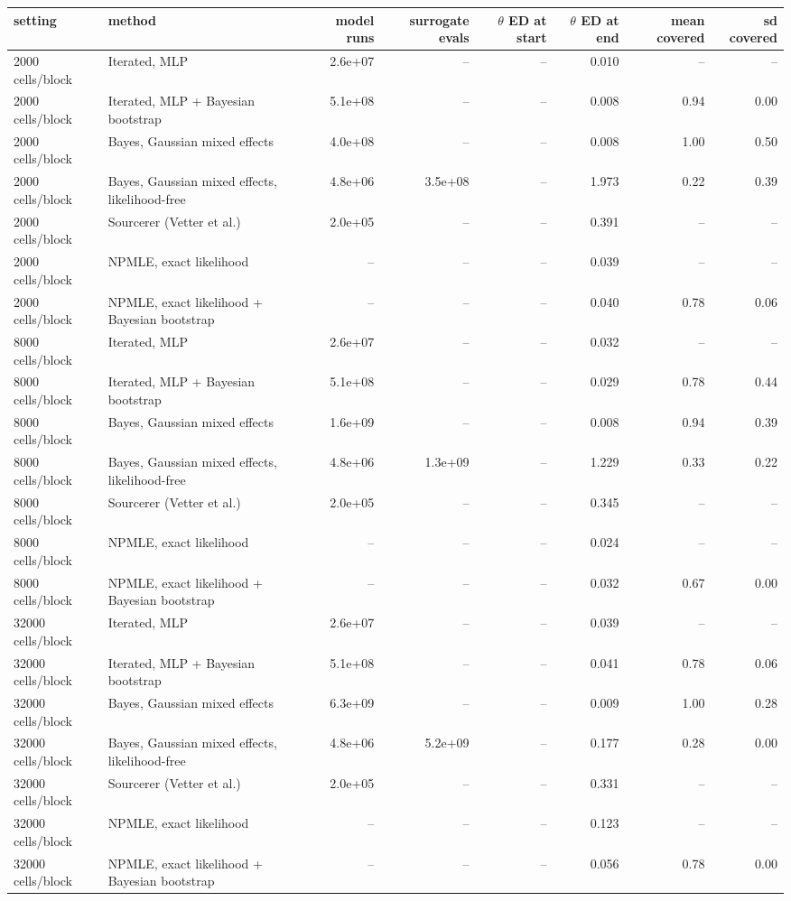 \begin{tabular}{llrrrrrr}
\toprule
setting & method & model runs & surrogate evals & $\theta$ ED at start & $\theta$ ED at end & mean covered & sd covered \\
\midrule
2000 cells/block & Iterated, MLP & 2.6e+07 & -- & -- & 0.010 & -- & -- \\
2000 cells/block & Iterated, MLP + Bayesian bootstrap & 5.1e+08 & -- & -- & 0.008 & 0.94 & 0.00 \\
2000 cells/block & Bayes, Gaussian mixed effects & 4.0e+08 & -- & -- & 0.008 & 1.00 & 0.50 \\
2000 cells/block & Bayes, Gaussian mixed effects, likelihood-free & 4.8e+06 & 3.5e+08 & -- & 1.973 & 0.22 & 0.39 \\
2000 cells/block & Sourcerer (Vetter et al.) & 2.0e+05 & -- & -- & 0.391 & -- & -- \\
2000 cells/block & NPMLE, exact likelihood & -- & -- & -- & 0.039 & -- & -- \\
2000 cells/block & NPMLE, exact likelihood + Bayesian bootstrap & -- & -- & -- & 0.040 & 0.78 & 0.06 \\
8000 cells/block & Iterated, MLP & 2.6e+07 & -- & -- & 0.032 & -- & -- \\
8000 cells/block & Iterated, MLP + Bayesian bootstrap & 5.1e+08 & -- & -- & 0.029 & 0.78 & 0.44 \\
8000 cells/block & Bayes, Gaussian mixed effects & 1.6e+09 & -- & -- & 0.008 & 0.94 & 0.39 \\
8000 cells/block & Bayes, Gaussian mixed effects, likelihood-free & 4.8e+06 & 1.3e+09 & -- & 1.229 & 0.33 & 0.22 \\
8000 cells/block & Sourcerer (Vetter et al.) & 2.0e+05 & -- & -- & 0.345 & -- & -- \\
8000 cells/block & NPMLE, exact likelihood & -- & -- & -- & 0.024 & -- & -- \\
8000 cells/block & NPMLE, exact likelihood + Bayesian bootstrap & -- & -- & -- & 0.032 & 0.67 & 0.00 \\
32000 cells/block & Iterated, MLP & 2.6e+07 & -- & -- & 0.039 & -- & -- \\
32000 cells/block & Iterated, MLP + Bayesian bootstrap & 5.1e+08 & -- & -- & 0.041 & 0.78 & 0.06 \\
32000 cells/block & Bayes, Gaussian mixed effects & 6.3e+09 & -- & -- & 0.009 & 1.00 & 0.28 \\
32000 cells/block & Bayes, Gaussian mixed effects, likelihood-free & 4.8e+06 & 5.2e+09 & -- & 0.177 & 0.28 & 0.00 \\
32000 cells/block & Sourcerer (Vetter et al.) & 2.0e+05 & -- & -- & 0.331 & -- & -- \\
32000 cells/block & NPMLE, exact likelihood & -- & -- & -- & 0.123 & -- & -- \\
32000 cells/block & NPMLE, exact likelihood + Bayesian bootstrap & -- & -- & -- & 0.056 & 0.78 & 0.00 \\
\bottomrule
\end{tabular}
